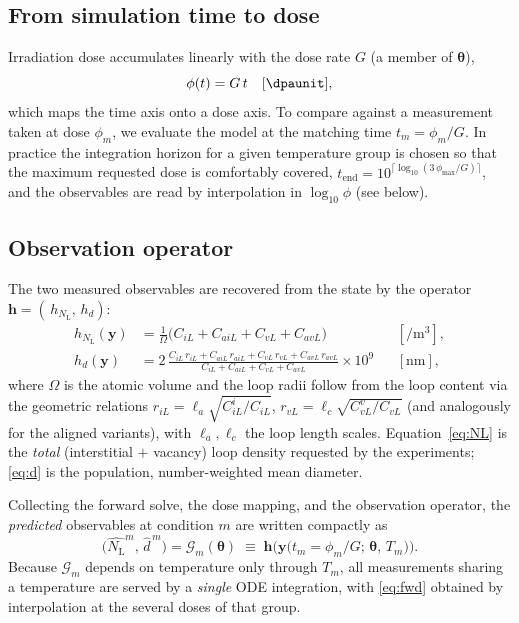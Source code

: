 \documentclass[11pt]{article}
\newcommand{\param}{\bm{\theta}}
\newcommand{\NL}{N_{\mathrm{L}}}
\newcommand{\dpa}{\phi}
\begin{document}
\subsection{From simulation time to dose}
Irradiation dose accumulates linearly with the dose rate $G$ (a member of $\param$),
\begin{equation}
  \dpa(t)=G\,t \quad[\si{\dpaunit}],
  \label{eq:dose}
\end{equation}
which maps the time axis onto a dose axis. To compare against a measurement taken
at dose $\dpa_m$, we evaluate the model at the matching time $t_m=\dpa_m/G$. In
practice the integration horizon for a given temperature group is chosen so that
the maximum requested dose is comfortably covered,
\(t_{\mathrm{end}}=10^{\lceil \log_{10}(3\,\dpa_{\max}/G)\rceil}\), and the
observables are read by interpolation in $\log_{10}\dpa$ (see below).

\subsection{Observation operator}
The two measured observables are recovered from the state by the operator
$\bm{h}=(\,h_{\NL},\,h_{d})$:
\begin{align}
  h_{\NL}(\bm{y}) &= \frac{1}{\Omega}\Big(C_{iL}+C_{aiL}+C_{vL}+C_{avL}\Big)
  &&[\si{\per\cubic\metre}], \label{eq:NL}\\[4pt]
  h_{d}(\bm{y}) &= 2\,\frac{C_{iL}\,r_{iL}+C_{aiL}\,r_{aiL}
                      +C_{vL}\,r_{vL}+C_{avL}\,r_{avL}}
                     {C_{iL}+C_{aiL}+C_{vL}+C_{avL}}\times 10^{9}
  &&[\si{\nano\metre}], \label{eq:d}
\end{align}
where $\Omega$ is the atomic volume and the loop radii follow from the loop
content via the geometric relations
\(r_{iL}=\ell_a\sqrt{C_{iL}^{i}/C_{iL}}\),
\(r_{vL}=\ell_c\sqrt{C_{vL}^{v}/C_{vL}}\) (and analogously for the aligned
variants), with $\ell_a,\ell_c$ the loop length scales. Equation~\eqref{eq:NL} is
the \emph{total} (interstitial $+$ vacancy) loop density requested by the
experiments; \eqref{eq:d} is the population, number-weighted mean diameter.

Collecting the forward solve, the dose mapping, and the observation operator, the
\emph{predicted} observables at condition $m$ are written compactly as
\begin{equation}
  \big(\widehat{\NL}^{m},\,\widehat{d}^{\,m}\big)
  =\mathcal{G}_m(\param)
  \;\equiv\;
  \bm{h}\!\Big(\bm{y}\big(t_m=\dpa_m/G;\,\param,\,T_m\big)\Big).
  \label{eq:fwd}
\end{equation}
Because $\mathcal{G}_m$ depends on temperature only through $T_m$, all
measurements sharing a temperature are served by a \emph{single} ODE integration,
with \eqref{eq:fwd} obtained by interpolation at the several doses of that group.
\end{document}
